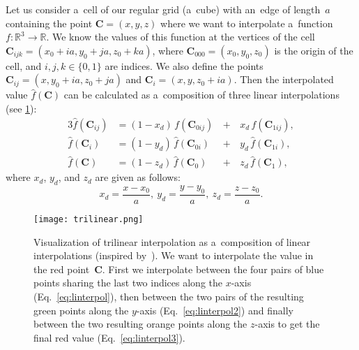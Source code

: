 				Let us consider a~cell of our regular grid (a~cube) with an~edge of length~$a$ containing the point $\mathbf{C} = (x,y,z)$ where we want to interpolate a~function $f\colon\mathbb{R}^3\to\mathbb{R}$. We know the values of this function at the vertices of the cell $\mathbf{C}_{ijk} = (x_0+ia,y_0+ja,z_0+ka)$, where $\mathbf{C}_{000} = (x_0,y_0,z_0)$ is the origin of the cell, and $i,j,k \in \{0,1\}$ are indices. We also define the points $\mathbf{C}_{ij} = (x,y_0+ia,z_0+ja)$ and $\mathbf{C}_i=(x,y,z_0+ia)$. Then the interpolated value $\widehat{f}(\mathbf{C})$ can be calculated as a~composition of three linear interpolations (see \cref{fig:trilin}):
					\begin{alignat}{3}
						\label{eq:linterpol}
						\widehat{f}(\mathbf{C}_{ij}) &= (1-x_d)\,f(\mathbf{C}_{0ij}) \,&+&\,x_d\, f(\mathbf{C}_{1ij}),\\
						\label{eq:linterpol2}
						\widehat{f}(\mathbf{C}_{i}) &= (1-y_d)\,\widehat{f}(\mathbf{C}_{0i}) &+&\,y_d\, \widehat{f}(\mathbf{C}_{1i}),\\
						\label{eq:linterpol3}
						\widehat{f}(\mathbf{C}) &= (1-z_d)\,\widehat{f}(\mathbf{C}_0) &+&\,z_d\, \widehat{f}(\mathbf{C}_1),
					\end{alignat}
				where $x_d$, $y_d$, and $z_d$ are given as follows:
					\begin{equation}
						x_d = \frac{x-x_0}{a},~y_d = \frac{y-y_0}{a},~z_d = \frac{z-z_0}{a}.
					\end{equation}
					
				\begin{figure}
					\centering
					\texttt{[image: trilinear.png]}
					\caption{Visualization of trilinear interpolation as a~composition of linear interpolations (inspired by~\cite{trilinear1}). We want to interpolate the value in the red point~$\mathbf{C}$. First we interpolate between the four pairs of blue points sharing the last two indices along the $x$\protect\nobreakdash-axis (Eq.~\ref{eq:linterpol}), then between the two pairs of the resulting green points along the $y$\protect\nobreakdash-axis (Eq.~\ref{eq:linterpol2}) and finally between the two resulting orange points along the $z$\protect\nobreakdash-axis to get the final red value (Eq.~\ref{eq:linterpol3}).}
					\label{fig:trilin}
				\end{figure}
					
